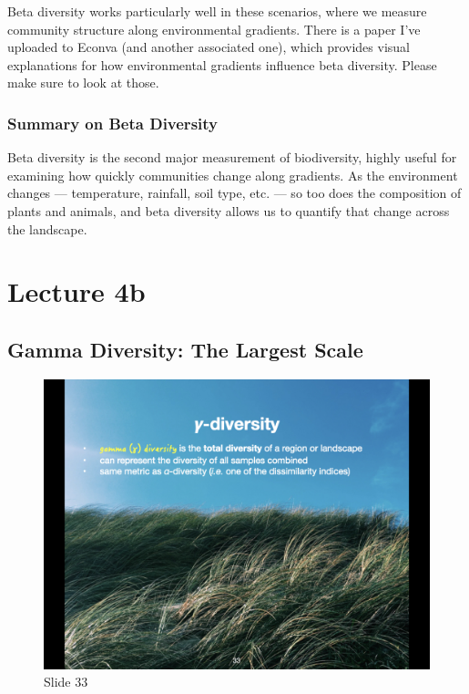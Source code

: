 \documentclass[
  10pt,
]{book}
\begin{document}
Beta diversity works particularly well in these scenarios, where we
measure community structure along environmental gradients. There is a
paper I've uploaded to Econva (and another associated one), which
provides visual explanations for how environmental gradients influence
beta diversity. Please make sure to look at those.

\subsection{Summary on Beta Diversity}\label{summary-on-beta-diversity}

Beta diversity is the second major measurement of biodiversity, highly
useful for examining how quickly communities change along gradients. As
the environment changes --- temperature, rainfall, soil type, etc. ---
so too does the composition of plants and animals, and beta diversity
allows us to quantify that change across the landscape.

\chapter*{Lecture 4b}\label{lecture-4b}

\section{Gamma Diversity: The Largest
Scale}\label{gamma-diversity-the-largest-scale}

\begin{figure}[ht]
\centering
\includegraphics[width=0.8\linewidth]{../images/BDC334/BDC334-033.jpeg}
\caption*{Slide 33}
\end{figure}
\end{document}

